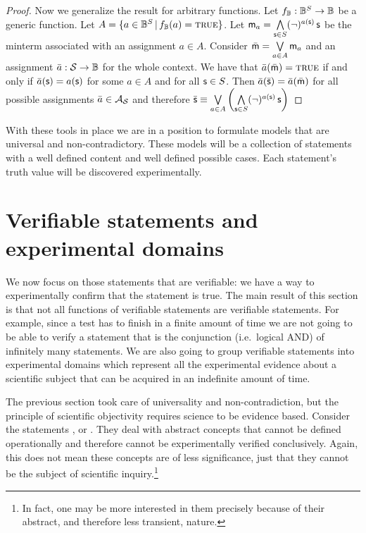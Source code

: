 \documentclass[11pt,letterpaper,fleqn]{memoir} %
\begin{document}
\begin{mathSection}
\begin{proof}
		Now we generalize the result for arbitrary functions. Let $f_\Bool : \Bool^S \to \Bool$ be a generic function. Let $A = \{ a \in \Bool^S \, | \, f_\Bool(a) = \TRUE \}$. Let $\stmt[m]_a = \bigAND \limits_{\stmt \in S} (\NOT)^{a(\stmt)} \, \stmt$ be the minterm associated with an assignment $a \in A$. Consider $\bar{\stmt[m]} = \bigOR \limits_{a \in A} \stmt[m]_a$ and an assignment $\bar{a} : \logCtx \to \Bool$ for the whole context. We have that $\bar{a}(\bar{\stmt[m]}) = \TRUE$ if and only if $\bar{a}(\stmt) = a(\stmt)$ for some $a \in A$ and for all $\stmt \in S$. Then $\bar{a}(\bar{\stmt}) = \bar{a}(\bar{\stmt[m]})$ for all possible assignments $\bar{a} \in \pAss$ and therefore $\bar{\stmt} \equiv \bigOR \limits_{a \in A} \left( \bigAND \limits_{\stmt \in S} (\NOT)^{a(\stmt)} \, \stmt \right)$
	\end{proof}
\end{mathSection}

With these tools in place we are in a position to formulate models that are universal and non-contradictory. These models will be a collection of statements with a well defined content and well defined possible cases. Each statement's truth value will be discovered experimentally.

\section{Verifiable statements and experimental domains}

We now focus on those statements that are verifiable: we have a way to experimentally confirm that the statement is true. The main result of this section is that not all functions of verifiable statements are verifiable statements. For example, since a test has to finish in a finite amount of time we are not going to be able to verify a statement that is the conjunction (i.e.~logical AND) of infinitely many statements. We are also going to group verifiable statements into experimental domains which represent all the experimental evidence about a scientific subject that can be acquired in an indefinite amount of time.

The previous section took care of universality and non-contradiction, but the principle of scientific objectivity requires science to be evidence based. Consider the statements ,  or . They deal with abstract concepts that cannot be defined operationally and therefore cannot be experimentally verified conclusively.  Again, this does not mean these concepts are of less significance, just that they cannot be the subject of scientific inquiry.\footnote{In fact, one may be more interested in them precisely because of their abstract, and therefore less transient, nature.}
\end{document}
